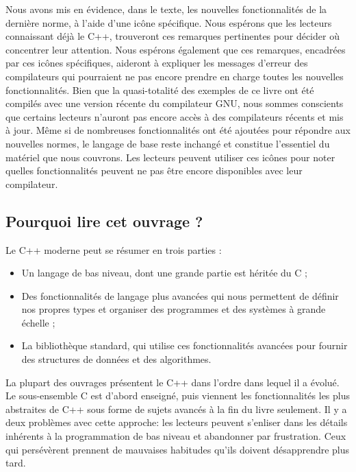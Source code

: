 \documentclass[a4paper,18pt,twoside]{report}
\begin{document}
Nous avons mis en évidence, dans le texte, les nouvelles fonctionnalités de la dernière norme, à l'aide d'une icône spécifique. Nous espérons que les lecteurs connaissant déjà le C++, trouveront ces remarques pertinentes pour décider où concentrer leur attention. Nous espérons également que ces remarques, encadrées par ces icônes spécifiques, aideront à expliquer les messages d'erreur des compilateurs qui pourraient ne pas encore prendre en charge toutes les nouvelles fonctionnalités. Bien que la quasi-totalité des exemples de ce livre ont été compilés avec une version récente du compilateur GNU, nous sommes conscients que certains lecteurs n'auront pas encore accès à des compilateurs récents et mis à jour. Même si de nombreuses fonctionnalités ont été ajoutées pour répondre aux nouvelles normes, le langage de base reste inchangé et constitue l'essentiel du matériel que nous couvrons. Les lecteurs peuvent utiliser ces icônes pour noter quelles fonctionnalités peuvent ne pas être encore disponibles avec leur compilateur.

\subsection{Pourquoi lire cet ouvrage ?}
Le C++ moderne peut se résumer en trois parties :

\medbreak
\begin{itemize}
	\item[\textbullet] Un langage de bas niveau, dont une grande partie est héritée du C ;
	\item[\textbullet] Des fonctionnalités de langage plus avancées qui nous permettent de définir nos propres types et organiser des programmes et des systèmes à grande échelle ;
	\item[\textbullet] La bibliothèque standard, qui utilise ces fonctionnalités avancées pour fournir des structures de données et des algorithmes.
\end{itemize}

\medbreak
La plupart des ouvrages présentent le C++ dans l'ordre dans lequel il a évolué. Le sous-ensemble C est d'abord enseigné, puis viennent les fonctionnalités les plus abstraites de C++ sous forme de sujets avancés à la fin du livre seulement. Il y a deux problèmes avec cette approche: les lecteurs peuvent s'enliser dans les détails inhérents à la programmation de bas niveau et abandonner par frustration. Ceux qui persévèrent prennent de mauvaises habitudes qu'ils doivent désapprendre plus tard.
\end{document}
